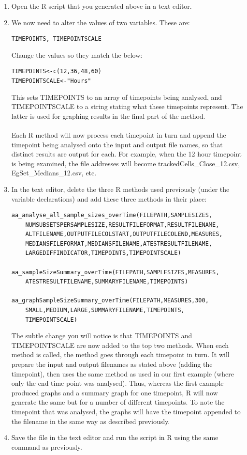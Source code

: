 \documentclass[a4paper,11pt]{article}
\begin{document}
\begin{enumerate}
\item Open the R script that you generated above in a text editor.
\item We now need to alter the values of two variables. These are:
\begin{verbatim}
TIMEPOINTS, TIMEPOINTSCALE
\end{verbatim}
Change the values so they match the below:
\begin{verbatim}
TIMEPOINTS<-c(12,36,48,60)
TIMEPOINTSCALE<-"Hours"
\end{verbatim}

This sets TIMEPOINTS to an array of timepoints being analysed, and TIMEPOINTSCALE to a string stating what these timepoints represent. The latter is used for graphing results in the final part of the method.\\
\\
Each R method will now process each timepoint in turn and append the timepoint being analysed onto the input and output file names, so that distinct results are output for each.  For example, when the 12 hour timepoint is being examined, the file addresses will become trackedCells\_Close\_12.csv, EgSet\_Medians\_12.csv, etc.\\

\item In the text editor, delete the three R methods used previously (under the variable declarations) and add these three methods in their place:
\begin{verbatim}
aa_analyse_all_sample_sizes_overTime(FILEPATH,SAMPLESIZES,
	NUMSUBSETSPERSAMPLESIZE,RESULTFILEFORMAT,RESULTFILENAME,
	ALTFILENAME,OUTPUTFILECOLSTART,OUTPUTFILECOLEND,MEASURES,
	MEDIANSFILEFORMAT,MEDIANSFILENAME,ATESTRESULTFILENAME,
	LARGEDIFFINDICATOR,TIMEPOINTS,TIMEPOINTSCALE)

aa_sampleSizeSummary_overTime(FILEPATH,SAMPLESIZES,MEASURES,
	ATESTRESULTFILENAME,SUMMARYFILENAME,TIMEPOINTS)

aa_graphSampleSizeSummary_overTime(FILEPATH,MEASURES,300,
	SMALL,MEDIUM,LARGE,SUMMARYFILENAME,TIMEPOINTS,
	TIMEPOINTSCALE)
\end{verbatim}

The subtle change you will notice is that TIMEPOINTS and TIMEPOINTSCALE are now added to the top two methods. When each method is called, the method goes through each timepoint in turn. It will prepare the input and output filenames as stated above (adding the timepoint), then uses the same method as used in our first example (where only the end time point was analysed). Thus, whereas the first example produced graphs and a summary graph for one timepoint, R will now generate the same but for a number of different timepoints. To note the timepoint that was analysed, the graphs will have the timepoint appended to the filename in the same way as described previously.\\

\item Save the file in the text editor and run the script in R using the same command as previously.

\end{enumerate}
\end{document}
